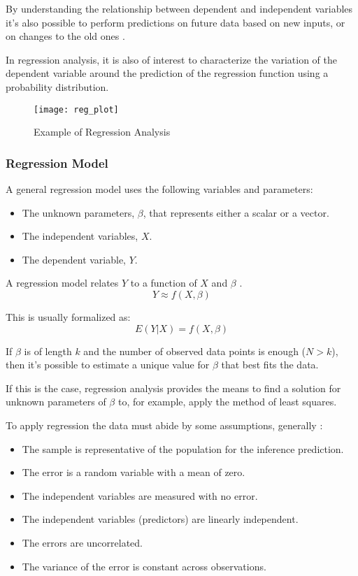 By understanding the relationship between dependent and independent variables it's also possible to perform predictions on future data based on new inputs, or on changes to the old ones \cite{wiki:reg_an}.

In regression analysis, it is also of interest to characterize the variation of the dependent variable around the prediction of the regression function using a probability distribution.

\begin{figure}[H]
	\centering
	\texttt{[image: reg\_plot]}
	\caption{Example of Regression Analysis}
	\label{fig:reg_plot}
\end{figure}	

\subsubsection*{Regression Model} 
A general regression model uses the following variables and parameters:
\begin{itemize}[noitemsep]
	\item The unknown parameters, $\beta$, that represents either a scalar or a vector.
	\item The independent variables, $X$. 
	\item The dependent variable, $Y$.
\end{itemize}

A regression model relates $Y$ to a function of $X$ and $\beta$ \cite{wiki:reg_an}.
\begin{equation}
	Y \approx f(X,\beta)
\end{equation}

This is usually formalized as:
\begin{equation}
	E(Y|X) = f(X,\beta)
\end{equation}

If $\beta$ is of length $k$ and the number of observed data points is enough ($N > k$), then it's possible to estimate a unique value for $\beta$ that best fits the data.

If this is the case, regression analysis provides the means to find a solution for unknown parameters of $\beta$ to, for example, apply the method of least squares.

To apply regression the data must abide by some assumptions, generally \cite{wiki:lin_reg}:
\begin{itemize}[noitemsep, topsep = -5pt]
	\item The sample is representative of the population for the inference prediction.
	\item The error is a random variable with a mean of zero.
	\item The independent variables are measured with no error.
	\item The independent variables (predictors) are linearly independent.
	\item The errors are uncorrelated.
	\item The variance of the error is constant across observations.
\end{itemize}


